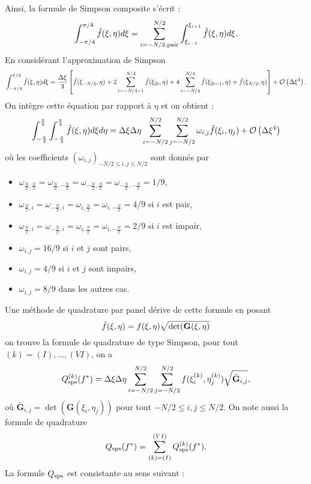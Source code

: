 Ainsi, la formule de Simpson composite s'écrit :
\begin{equation}
\displaystyle\int_{- \pi/4}^{\pi/4} \tilde{f}(\xi, \eta) d\xi = \displaystyle\sum\limits_{i=-N/2, \text{pair}}^{N/2} \displaystyle\int_{\xi_{i-1}}^{\xi_{i+1}} \tilde{f}(\xi, \eta) d\xi.
\end{equation}
En considérant l'approximation de Simpson
\begin{equation}
\displaystyle\int_{-\pi/4}^{\pi/4} \tilde{f}(\xi, \eta) d\xi = \dfrac{\Delta \xi}{3} \left[ \tilde{f}(\xi_{-N/2}, \eta) + 2 \displaystyle\sum\limits_{i=-N/4-1}^{N/4} \tilde{f}(\xi_{2i}, \eta)  + 4 \displaystyle\sum\limits_{i=-N/4}^{N/4} \tilde{f}(\xi_{2i-1}, \eta) + \tilde{f}(\xi_{N/2}, \eta) \right] + \mathcal{O}\left( \Delta \xi^4\right).
\end{equation}
On intègre cette équation par rapport à $\eta$ et on obtient :
\begin{equation}
\displaystyle\int_{-\frac{\pi}{4}}^{\frac{\pi}{4}} \displaystyle\int_{-\frac{\pi}{4}}^{\frac{\pi}{4}} \tilde{f}(\xi, \eta) d\xi  d\eta= \Delta\xi \Delta \eta \displaystyle\sum\limits_{i=-N/2}^{N/2}\displaystyle\sum\limits_{j=-N/2}^{N/2} \omega_{i,j} \tilde{f}(\xi_i, \eta_j) + \mathcal{O}\left( \Delta \xi^4\right)
\label{eq:simpson 2d}
\end{equation}
où les coefficients $(\omega_{i,j})_{-N/2 \leq i,j \leq N/2}$ sont donnés par
\begin{itemize}
\item $\omega_{\frac{N}{2},\frac{N}{2}}=\omega_{\frac{N}{2},-\frac{N}{2}}=\omega_{-\frac{N}{2},\frac{N}{2}}=\omega_{-\frac{N}{2},-\frac{N}{2}}=1/9$,
\item $\omega_{\frac{N}{2},i}=\omega_{-\frac{N}{2},i}=\omega_{i,\frac{N}{2}}=\omega_{i,-\frac{N}{2}}=4/9$ si $i$ est pair,
\item $\omega_{\frac{N}{2},i}=\omega_{-\frac{N}{2},i}=\omega_{i,\frac{N}{2}}=\omega_{i,-\frac{N}{2}}=2/9$ si $i$ est impair,
\item $\omega_{i,j}=16/9$ si $i$ et $j$ sont pairs,
\item $\omega_{i,j}=4/9$ si $i$ et $j$ sont impairs,
\item $\omega_{i,j}=8/9$ dans les autres cas.
\end{itemize}

Une méthode de quadrature par panel dérive de cette formule en posant 
\begin{equation}
\tilde{f}(\xi, \eta) = f(\xi, \eta) \sqrt{\det(\mathbf{G}(\xi, \eta)}
\end{equation}
on trouve la formule de quadrature de type Simpson,
pour tout $(k) = (I), ..., (VI)$, on a
\begin{equation}
Q_{\text{sps}}^{(k)}(f^*) = \Delta \xi \Delta \eta \displaystyle\sum\limits_{i=-N/2}^{N/2} \displaystyle\sum\limits_{j=-N/2}^{N/2} f(\xi_i^{(k)},\eta_j^{(k)}) \sqrt{\bar{\mathbf{G}}_{i,j}},
\end{equation}
où $\bar{\mathbf{G}}_{i,j}=\det(\mathbf{G}(\xi_i,\eta_j))$ pour tout $-N/2 \leq i,j \leq N/2$. On note aussi la formule de quadrature
\begin{equation}
Q_{\text{sps}}(f^*) = \displaystyle\sum\limits_{(k)=(I)}^{(VI)}Q_{\text{sps}}^{(k)}(f^*).
\end{equation}
La formule $Q_{\text{sps}}$ est consistante au sens suivant :


